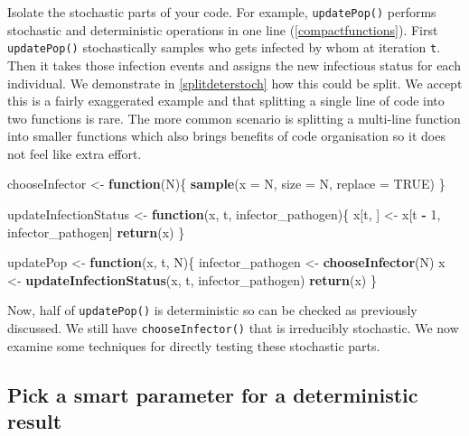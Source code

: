 \documentclass[
]{article}
\newenvironment{Shaded}{\begin{snugshade}}{\end{snugshade}}
\newcommand{\ControlFlowTok}[1]{\textcolor[rgb]{0.13,0.29,0.53}{\textbf{#1}}}
\newcommand{\DataTypeTok}[1]{\textcolor[rgb]{0.13,0.29,0.53}{#1}}
\newcommand{\DecValTok}[1]{\textcolor[rgb]{0.00,0.00,0.81}{#1}}
\newcommand{\KeywordTok}[1]{\textcolor[rgb]{0.13,0.29,0.53}{\textbf{#1}}}
\newcommand{\NormalTok}[1]{#1}
\newcommand{\OperatorTok}[1]{\textcolor[rgb]{0.81,0.36,0.00}{\textbf{#1}}}
\newcommand{\OtherTok}[1]{\textcolor[rgb]{0.56,0.35,0.01}{#1}}
\newcommand{\StringTok}[1]{\textcolor[rgb]{0.31,0.60,0.02}{#1}}
\begin{document}
Isolate the stochastic parts of your code.
For example, \texttt{updatePop()} performs stochastic and deterministic operations in one line (\ref{compactfunctions}).
First \texttt{updatePop()} stochastically samples who gets infected by whom at iteration \texttt{t}.
Then it takes those infection events and assigns the new infectious status for each individual.
We demonstrate in \ref{splitdeterstoch} how this could be split.
We accept this is a fairly exaggerated example and that splitting a single line of code into two functions is rare.
The more common scenario is splitting a multi-line function into smaller functions which also brings benefits of code organisation so it does not feel like extra effort.
\newline
{}\label{splitdeterstoch}

\begin{Shaded}
\begin{Highlighting}[]
\NormalTok{chooseInfector <-}\StringTok{ }\ControlFlowTok{function}\NormalTok{(N)\{}
  \KeywordTok{sample}\NormalTok{(}\DataTypeTok{x =}\NormalTok{ N, }\DataTypeTok{size =}\NormalTok{ N, }\DataTypeTok{replace =} \OtherTok{TRUE}\NormalTok{)}
\NormalTok{\}}

\NormalTok{updateInfectionStatus <-}\StringTok{ }\ControlFlowTok{function}\NormalTok{(x, t, infector_pathogen)\{}
\NormalTok{  x[t, ] <-}\StringTok{ }\NormalTok{x[t }\OperatorTok{-}\StringTok{ }\DecValTok{1}\NormalTok{, infector_pathogen]}
  \KeywordTok{return}\NormalTok{(x)}
\NormalTok{\}}

\NormalTok{updatePop <-}\StringTok{ }\ControlFlowTok{function}\NormalTok{(x, t, N)\{}
\NormalTok{  infector_pathogen <-}\StringTok{ }\KeywordTok{chooseInfector}\NormalTok{(N)}
\NormalTok{  x <-}\StringTok{ }\KeywordTok{updateInfectionStatus}\NormalTok{(x, t, infector_pathogen)}
  \KeywordTok{return}\NormalTok{(x)}
\NormalTok{\}}
\end{Highlighting}
\end{Shaded}

Now, half of \texttt{updatePop()} is deterministic so can be checked as previously discussed.
We still have \texttt{chooseInfector()} that is irreducibly stochastic.
We now examine some techniques for directly testing these stochastic parts.

\hypertarget{deterministicparams}{%
\subsection*{Pick a smart parameter for a deterministic result}\label{deterministicparams}}
\end{document}
